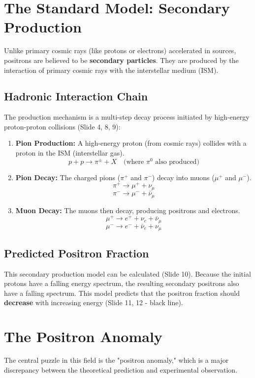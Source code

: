 \documentclass{sciposter}
\begin{document}
\begin{multicols}{3}
\section{The Standard Model: Secondary Production}
Unlike primary cosmic rays (like protons or electrons) accelerated in sources, positrons are believed to be \textbf{secondary particles}. They are produced by the interaction of primary cosmic rays with the interstellar medium (ISM).

\subsection{Hadronic Interaction Chain}
The production mechanism is a multi-step decay process initiated by high-energy proton-proton collisions (Slide 4, 8, 9):
\begin{enumerate}
    \item \textbf{Pion Production:} A high-energy proton (from cosmic rays) collides with a proton in the ISM (interstellar gas).
    $$ p + p \rightarrow \pi^{\pm} + X \quad (\text{where } \pi^0 \text{ also produced)} $$
    
    \item \textbf{Pion Decay:} The charged pions ($\pi^+$ and $\pi^-$) decay into muons ($\mu^+$ and $\mu^-$).
    $$ \pi^+ \rightarrow \mu^+ + \nu_{\mu} $$
    $$ \pi^- \rightarrow \mu^- + \bar{\nu}_{\mu} $$
    
    \item \textbf{Muon Decay:} The muons then decay, producing positrons and electrons.
    $$ \mu^+ \rightarrow e^+ + \nu_e + \bar{\nu}_{\mu} $$
    $$ \mu^- \rightarrow e^- + \bar{\nu}_e + \nu_{\mu} $$
\end{enumerate}

\subsection{Predicted Positron Fraction}
This secondary production model can be calculated (Slide 10). Because the initial protons have a falling energy spectrum, the resulting secondary positrons also have a falling spectrum. This model predicts that the positron fraction should \textbf{decrease} with increasing energy (Slide 11, 12 - black line).

\section{The Positron Anomaly}
The central puzzle in this field is the "positron anomaly," which is a major discrepancy between the theoretical prediction and experimental observation.


\end{multicols}
\end{document}

